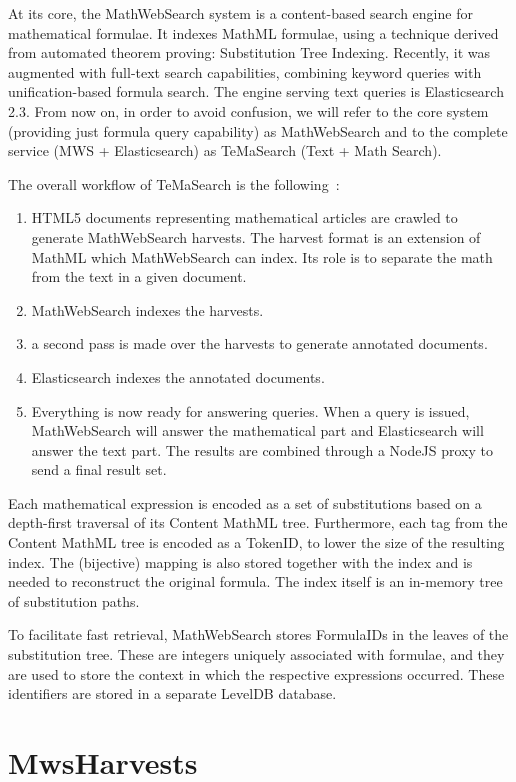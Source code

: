 \documentclass{deliverablereport}
\def\MWS{\textsf{MathWebSearch}\xspace}
\begin{document}
At its core, the \MWS system is a content-based search engine for mathematical
formulae. It indexes MathML formulae, using a technique derived from automated theorem
proving: Substitution Tree Indexing. Recently, it was augmented with full-text search
capabilities, combining keyword queries with unification-based formula search. The engine
serving text queries is Elasticsearch 2.3. From now on, in order to avoid confusion, we
will refer to the core system (providing just formula query capability) as \MWS and to the
complete service (MWS + Elasticsearch) as TeMaSearch (Text + Math Search).

The overall workflow of TeMaSearch is the following~\cite{Ham:bcs15}: 

\begin{enumerate}
\item HTML5 documents representing mathematical articles are crawled to generate \MWS
  harvests. The harvest format is an extension of MathML which \MWS can index. Its role is
  to separate the math from the text in a given document.
\item \MWS indexes the harvests.
\item a second pass is made over the harvests to generate annotated documents.
\item Elasticsearch indexes the annotated documents.
\item Everything is now ready for answering queries. When a query is issued, \MWS will
  answer the mathematical part and Elasticsearch will answer the text part. The results
  are combined through a NodeJS proxy to send a final result set.
\end{enumerate}

Each mathematical expression is encoded as a set of substitutions based on a depth-first
traversal of its Content MathML tree. Furthermore, each tag from the Content MathML tree
is encoded as a TokenID, to lower the size of the resulting index. The (bijective) mapping
is also stored together with the index and is needed to reconstruct the original
formula. The index itself is an in-memory tree of substitution paths.

To facilitate fast retrieval, \MWS stores FormulaIDs in the leaves of the substitution
tree. These are integers uniquely associated with formulae, and they are used to store the
context in which the respective expressions occurred. These identifiers are stored in a
separate LevelDB database.

\section{MwsHarvests}\label{sec:harvests}
\end{document}
